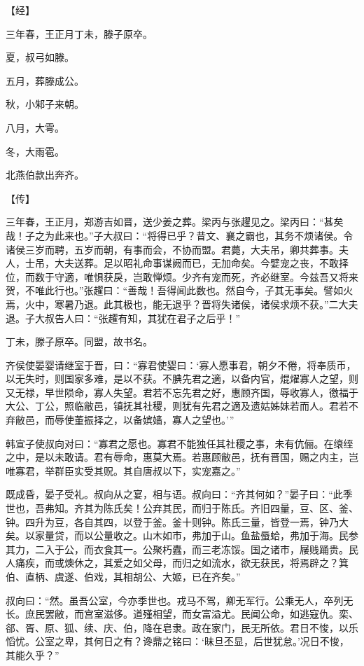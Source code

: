 \documentclass[a4paper,12pt,UTF8,twoside]{ctexbook}
\begin{document}
【经】

三年春，王正月丁未，滕子原卒。

夏，叔弓如滕。

五月，葬滕成公。

秋，小邾子来朝。

八月，大雩。

冬，大雨雹。

北燕伯款出奔齐。

【传】

三年春，王正月，郑游吉如晋，送少姜之葬。梁丙与张趯见之。梁丙曰：“甚矣哉！子之为此来也。”子大叔曰：“将得已乎？昔文、襄之霸也，其务不烦诸侯。令诸侯三岁而聘，五岁而朝，有事而会，不协而盟。君薨，大夫吊，卿共葬事。夫人，士吊，大夫送葬。足以昭礼命事谋阙而已，无加命矣。今嬖宠之丧，不敢择位，而数于守適，唯惧获戾，岂敢惮烦。少齐有宠而死，齐必继室。今兹吾又将来贺，不唯此行也。”张趯曰：“善哉！吾得闻此数也。然自今，子其无事矣。譬如火焉，火中，寒暑乃退。此其极也，能无退乎？晋将失诸侯，诸侯求烦不获。”二大夫退。子大叔告人曰：“张趯有知，其犹在君子之后乎！”

丁未，滕子原卒。同盟，故书名。

齐侯使晏婴请继室于晋，曰：“寡君使婴曰：‘寡人愿事君，朝夕不倦，将奉质币，以无失时，则国家多难，是以不获。不腆先君之適，以备内官，焜燿寡人之望，则又无禄，早世陨命，寡人失望。君若不忘先君之好，惠顾齐国，辱收寡人，徼福于大公、丁公，照临敝邑，镇抚其社稷，则犹有先君之適及遗姑姊妹若而人。君若不弃敝邑，而辱使董振择之，以备嫔嫱，寡人之望也。’”

韩宣子使叔向对曰：“寡君之愿也。寡君不能独任其社稷之事，未有伉俪。在缞绖之中，是以未敢请。君有辱命，惠莫大焉。若惠顾敝邑，抚有晋国，赐之内主，岂唯寡君，举群臣实受其贶。其自唐叔以下，实宠嘉之。”

既成昏，晏子受礼。叔向从之宴，相与语。叔向曰：“齐其何如？”晏子曰：“此季世也，吾弗知。齐其为陈氏矣！公弃其民，而归于陈氏。齐旧四量，豆、区、釜、钟。四升为豆，各自其四，以登于釜。釜十则钟。陈氏三量，皆登一焉，钟乃大矣。以家量贷，而以公量收之。山木如市，弗加于山。鱼盐蜃蛤，弗加于海。民参其力，二入于公，而衣食其一。公聚朽蠹，而三老冻馁。国之诸市，屦贱踊贵。民人痛疾，而或燠休之，其爱之如父母，而归之如流水，欲无获民，将焉辟之？箕伯、直柄、虞遂、伯戏，其相胡公、大姬，已在齐矣。”

叔向曰：“然。虽吾公室，今亦季世也。戎马不驾，卿无军行。公乘无人，卒列无长。庶民罢敝，而宫室滋侈。道殣相望，而女富溢尤。民闻公命，如逃寇仇。栾、郤、胥、原、狐、续、庆、伯，降在皂隶。政在家门，民无所依。君日不悛，以乐慆忧。公室之卑，其何日之有？谗鼎之铭曰：‘昧旦丕显，后世犹怠。’况日不悛，其能久乎？”
\end{document}
